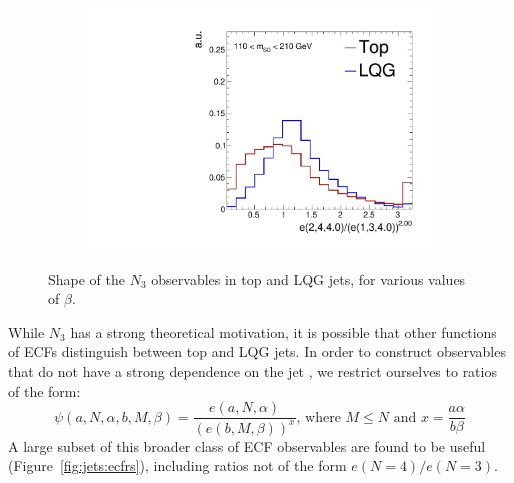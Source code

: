 \begin{figure}[]
\begin{center}
\begin{subfigure}[t]{0.32\textwidth}
            \includegraphics[width=\textwidth]{figures/toptagging/shapes/mass_ratio_24401340.pdf}
        \end{subfigure}
        \caption{Shape of the $N_3$ observables in top and LQG jets, for various values of $\beta$.}
        \label{fig:jets:n3}
    \end{center}
\end{figure}

While $N_3$ has a strong theoretical motivation, it is possible that other functions of ECFs  distinguish between top and LQG jets.
In order to construct observables that do not have a strong dependence on the jet \pt, we restrict ourselves to ratios of the form:
\begin{equation}
    \psi(a,N,\alpha,b,M,\beta) = 
    \frac{e(a,N,\alpha)}{\left(e(b,M,\beta)\right)^x} 
    \text{, where } M\leq N \text{ and } x = \frac{a\alpha}{b\beta}
\end{equation}
A large subset of this broader class of ECF observables are found to be useful (Figure~\ref{fig:jets:ecfrs}), including ratios not of the form $e(N=4)/e(N=3)$.

